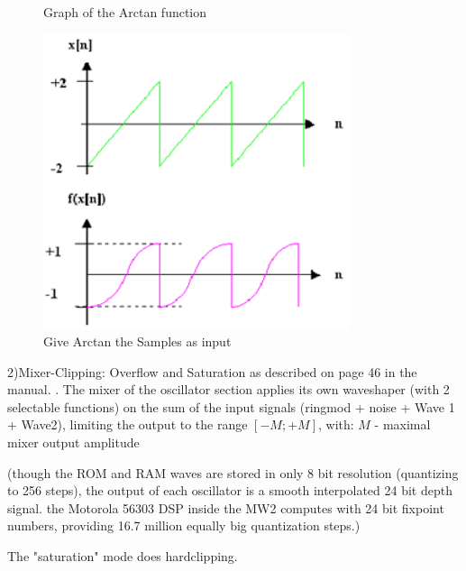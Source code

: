 \begin{example}
\begin{enumerate}
\begin{figure}[ht!]
		\caption{Graph of the Arctan function}
		\label{hard_clip_sample}
	\end{figure}
	\bigskip %
	\begin{figure}[ht!]
		\centering
		\includegraphics[width=90mm]{pics/soft_clip_2.png}
		\caption{Give Arctan the Samples as input}
		\label{hard_clip_sample}
	\end{figure}
	\end{enumerate}
\end{example}
2)Mixer-Clipping: Overflow and Saturation as described on page 46 in the manual. . The mixer of the oscillator section applies its own waveshaper (with 2 selectable functions) on the sum of the input signals (ringmod + noise + Wave 1 + Wave2), limiting the output to the range $[-M;+M]$, with: $M$ - maximal mixer output amplitude

(though the ROM and RAM waves are stored in only 8 bit resolution (quantizing to 256 steps), the output of each oscillator is a smooth interpolated 24 bit depth signal. the Motorola 56303 DSP inside the MW2 computes with 24 bit fixpoint numbers, providing 16.7 million equally big quantization steps.)

The "saturation" mode does hardclipping.

